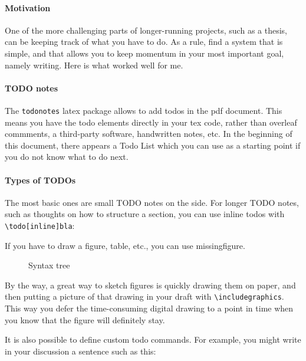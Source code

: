 \paragraph{Motivation}
One of the more challenging parts of longer-running projects, such as a thesis, can be keeping track of what you have to do. 
As a rule, find a system that is simple, and that allows you to keep momentum in your most important goal, namely writing. 
Here is what worked well for me. 

\paragraph{TODO notes}
The \texttt{todonotes} latex package allows to add todos in the pdf document. This means you have the todo elements directly in your tex code, rather than overleaf commments, a third-party software, handwritten notes, etc. 
In the beginning of this document, there appears a Todo List which you can use as a starting point if you do not know what to do next. 



\paragraph{Types of TODOs}

The most basic ones are small TODO notes on the side. 
For longer TODO notes, such as thoughts on how to structure a section, you can use inline todos with \texttt{\textbackslash todo[inline]{bla}}: 


If you have to draw a figure, table, etc., you can use missingfigure. 

\begin{figure}
    \caption{Syntax tree}
    \label{fig:syntaxtree}
\end{figure}

By the way, a great way to sketch figures is quickly drawing them on paper, and then putting a picture of that drawing in your draft with \texttt{\textbackslash includegraphics}. This way you defer the time-consuming digital drawing to a point in time when you know that the figure will definitely stay.  


It is also possible to define custom todo commands. 
For example, you might write in your discussion a sentence such as this: 

